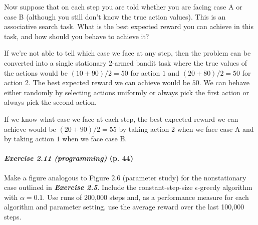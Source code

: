 \documentclass[10pt,a4paper]{article}
\begin{document}
Now suppose that on each step you are told whether you are facing case A or case B (although you still don't know the true action values). This is an associative search task. What is the best expected reward you can achieve in this task, and how should you behave to achieve it?

\bigskip
If we're not able to tell which case we face at any step, then the problem can be converted into a single stationary $2$-armed bandit task where the true values of the actions would be $(10 + 90)/2 = 50$ for action $1$ and $(20 + 80)/2 = 50$ for action $2$. The best expected reward we can achieve would be $50$. We can behave either randomly by selecting actions uniformly or always pick the first action or always pick the second action.

If we know what case we face at each step, the best expected reward we can achieve would be $(20 + 90)/2=55$ by taking action $2$ when we face case A and by taking action $1$ when we face case B.


\paragraph{\textit{Exercise 2.11 (programming)} (p. 44)} Make a figure analogous to Figure $2.6$ (parameter study) for the nonstationary case outlined in \textbf{\textit{Exercise 2.5}}. Include the constant-step-size $\epsilon$-greedy algorithm with
$\alpha=0.1$. Use runs of 200,000 steps and, as a performance measure for each algorithm and parameter setting, use the average reward over the last 100,000 steps.
\end{document}
